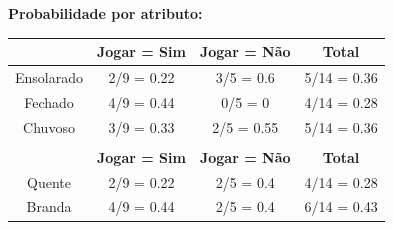 \documentclass{article}
\begin{document}
\textbf{Probabilidade por atributo:}
  \begin{table}[H]
    \centering
    \begin{tabular}{cccc}
      \hline
      \rowcolor[HTML]{EFEFEF} 
      \multicolumn{1}{|c|}{\cellcolor[HTML]{EFEFEF}\textbf{Tempo}}       & \multicolumn{1}{c|}{\cellcolor[HTML]{EFEFEF}\textbf{Jogar = Sim}} & \multicolumn{1}{c|}{\cellcolor[HTML]{EFEFEF}\textbf{Jogar = Não}} & \multicolumn{1}{c|}{\cellcolor[HTML]{EFEFEF}\textbf{Total}} \\ \hline
      \multicolumn{1}{|c|}{Ensolarado}                                   & \multicolumn{1}{c|}{2/9 = 0.22}                                   & \multicolumn{1}{c|}{3/5 = 0.6}                                    & \multicolumn{1}{c|}{5/14 = 0.36}                            \\ \hline
      \multicolumn{1}{|c|}{Fechado}                                      & \multicolumn{1}{c|}{4/9 = 0.44}                                   & \multicolumn{1}{c|}{0/5 = 0}                                      & \multicolumn{1}{c|}{4/14 = 0.28}                            \\ \hline
      \multicolumn{1}{|c|}{Chuvoso}                                      & \multicolumn{1}{c|}{3/9 = 0.33}                                   & \multicolumn{1}{c|}{2/5 = 0.55}                                   & \multicolumn{1}{c|}{5/14 = 0.36}                            \\ \hline
      \multicolumn{1}{l}{}                                               & \multicolumn{1}{l}{}                                              & \multicolumn{1}{l}{}                                              & \multicolumn{1}{l}{}                                        \\ \hline
      \rowcolor[HTML]{EFEFEF} 
      \multicolumn{1}{|c|}{\cellcolor[HTML]{EFEFEF}\textbf{Temperatura}} & \multicolumn{1}{c|}{\cellcolor[HTML]{EFEFEF}\textbf{Jogar = Sim}} & \multicolumn{1}{c|}{\cellcolor[HTML]{EFEFEF}\textbf{Jogar = Não}} & \multicolumn{1}{c|}{\cellcolor[HTML]{EFEFEF}\textbf{Total}} \\ \hline
      \multicolumn{1}{|c|}{Quente}                                       & \multicolumn{1}{c|}{2/9 = 0.22}                                   & \multicolumn{1}{c|}{2/5 = 0.4}                                    & \multicolumn{1}{c|}{4/14 = 0.28}                            \\ \hline
      \multicolumn{1}{|c|}{Branda}                                       & \multicolumn{1}{c|}{4/9 = 0.44}                                   & \multicolumn{1}{c|}{2/5 = 0.4}                                    & \multicolumn{1}{c|}{6/14 = 0.43}                            \\ \hline

\end{tabular}
\end{table}
\end{document}
